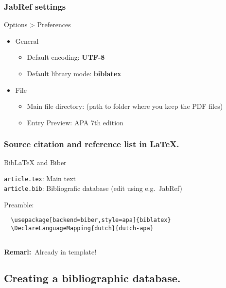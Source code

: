 \documentclass[aspectratio=169]{beamer}
\begin{document}
\begin{frame}
    \frametitle{JabRef settings}
    
    Options > Preferences
    
    \begin{itemize}
        \item General
        \begin{itemize}
            \item Default encoding: \textbf{UTF-8}
            \item Default library mode: \textbf{biblatex}
        \end{itemize}
        \item File
        \begin{itemize}
            \item Main file directory: (path to folder where you keep the PDF files)
        \end{itemize}
        \begin{itemize}
            \item Entry Preview: APA 7th edition
        \end{itemize}
    \end{itemize}
    
\end{frame}
\begin{frame}[fragile]
  \frametitle{Source citation and reference list in {\LaTeX}.}

  Bib{\LaTeX} and Biber

  \vspace{18pt}

  \verb|article.tex|: Main text\\
  \verb|article.bib|: Bibliografic database (edit using e.g.~JabRef)

  \bigskip

  Preamble:

  \begin{verbatim}
  \usepackage[backend=biber,style=apa]{biblatex}
  \DeclareLanguageMapping{dutch}{dutch-apa}
  
  \end{verbatim}

    \textbf{Remarl:}\ Already in template!
    
\end{frame}

\subsection{Creating a bibliographic database.}
\end{document}
